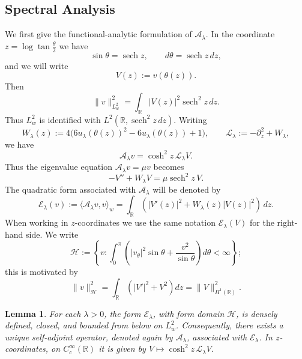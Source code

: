 \documentclass[11pt,a4paper]{article}
\DeclareMathOperator{\sech}{sech}
\numberwithin{equation}{section}
\theoremstyle{plain}
\newtheorem{lemma}[theorem]{Lemma}
\theoremstyle{remark}
\begin{document}
\subsection{Spectral Analysis}
We first give the functional-analytic formulation of
$\mathcal A_\lambda$. In the coordinate $z=\log\tan\frac{\theta}{2}$ we have
$$
\sin\theta=\sech z,
\qquad
d\theta=\sech z\,dz,
$$
and we will write
$$
V(z):=v(\theta(z)).
$$
Then
\begin{equation}
\|v\|_{L_w^2}^2
=
\int_{\mathbb R}|V(z)|^2\sech^2z\,dz.
\end{equation}
Thus $L_w^2$ is identified with $L^2(\mathbb R,\sech^2z\,dz)$. Writing
$$
W_\lambda(z)
:=
4\bigl(6u_\lambda(\theta(z))^2-6u_\lambda(\theta(z))+1\bigr),
\qquad
\mathscr L_\lambda:=-\partial_z^2+W_\lambda,
$$
we have
\begin{equation}
\mathcal A_\lambda v
=
\cosh^2z\,\mathscr L_\lambda V.
\end{equation}
Thus the eigenvalue equation
$\mathcal A_\lambda v=\mu v$ becomes
$$
-V''+W_\lambda V=\mu\sech^2z\,V.
$$
The quadratic form associated with $\mathcal A_\lambda$ will be denoted by
\begin{equation}
\mathcal E_\lambda(v)
:=
\langle\mathcal A_\lambda v,v\rangle_w
=
\int_{\mathbb R}
\left(
|V'(z)|^2+W_\lambda(z)|V(z)|^2
\right)\,dz.
\end{equation}
When working in $z$-coordinates we use the same notation $\mathcal E_\lambda(V)$ for the right-hand side.
We write
$$
\mathcal H
:=
\left\{
v:
\int_0^\pi
\left(
|v_\theta|^2\sin\theta
+
\frac{v^2}{\sin\theta}
\right)d\theta<\infty
\right\};
$$
this is motivated by 
\begin{equation}\label{H1identity}
\|v\|_{\mathcal H}^2
=
\int_{\mathbb R}
\left(
|V'|^2+V^2
\right)dz
=
\|V\|_{H^1(\mathbb R)}^2.
\end{equation}

\begin{lemma}
For each $\lambda>0$, the form $\mathcal E_\lambda$, with form domain $\mathcal H$, is densely
defined, closed, and bounded from below on $L_w^2$. Consequently,
there exists a unique self-adjoint operator, denoted again by
$\mathcal A_\lambda$, associated with $\mathcal E_\lambda$. In $z$-coordinates, on $C_c^\infty(\mathbb R)$ it is given by $V\mapsto\cosh^2z\,\mathscr L_\lambda V$.
\end{lemma}
\end{document}
